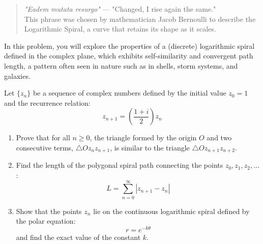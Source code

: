 \begin{solution}[Sketch]
\begin{center}
\end{center}
\vspace{0.5em}

\end{solution}


\begin{problem}

\begin{quote}
  	\textit{"Eadem mutata resurgo"} --- "Changed, I rise again the same." \\
  This phrase was chosen by mathematician Jacob Bernoulli to describe the Logarithmic Spiral, a curve that retains its shape as it scales.
\end{quote}

In this problem, you will explore the properties of a (discrete) logarithmic spiral defined in the complex plane, which exhibits self-similarity and convergent path length, a pattern often seen in nature such as in shells, storm systems, and galaxies.

\vspace{0.5em}

Let $\{z_n\}$ be a sequence of complex numbers defined by the initial value $z_0 = 1$ and the recurrence relation:
\[
z_{n+1} = \left( \frac{1 + i}{2} \right) z_n
\]

\begin{enumerate}
  \item[(i)] Prove that for all $n \ge 0$, the triangle formed by the origin $O$ and two consecutive terms, $\triangle O z_n z_{n+1}$, is similar to the triangle $\triangle O z_{n+1} z_{n+2}$.
    
  \item[(ii)] Find the length of the polygonal spiral path connecting the points $z_0, z_1, z_2, \dots$:
  \[ L = \sum_{n=0}^{\infty} |z_{n+1} - z_n| \]
    
  \item[(iii)] Show that the points $z_n$ lie on the continuous logarithmic spiral defined by the polar equation:
  \[ r = e^{-k\theta} \]
  and find the exact value of the constant $k$.
    

\end{enumerate}
\end{problem}
